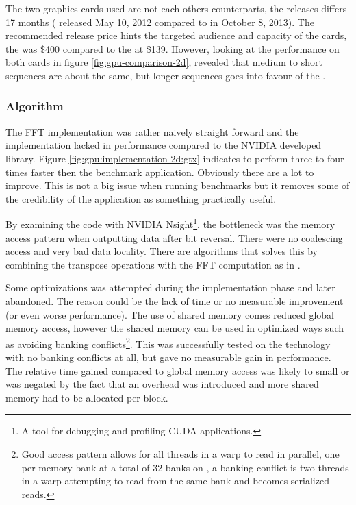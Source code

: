 The two graphics cards used are not each others counterparts, the releases differs 17 months ({\NVCARD} released May 10, 2012 compared to {\AMDCARD} in October 8, 2013). The recommended release price hints the targeted audience and capacity of the cards, the {\NVCARD} was \$400 compared to the {\AMDCARD} at \$139. However, looking at the {\OCL} performance on both cards in figure \ref{fig:gpu-comparison-2d}, revealed that medium to short sequences are about the same, but longer sequences goes into favour of the {\NVCARD}.

\subsubsection{Algorithm}

The \gls{FFT} implementation was rather naively straight forward and the implementation lacked in performance compared to the NVIDIA developed {\CUFFT} library. Figure \ref{fig:gpu:implementation-2d:gtx} indicates {\CUFFT} to perform three to four times faster then the benchmark application. Obviously there are a lot to improve. This is not a big issue when running benchmarks but it removes some of the credibility of the application as something practically useful.

By examining the code with NVIDIA Nsight\footnote{A tool for debugging and profiling CUDA applications.}, the bottleneck was the memory access pattern when outputting data after bit reversal. There were no coalescing access and very bad data locality. There are algorithms that solves this by combining the transpose operations with the FFT computation as in \cite{govindaraju2008high}.

Some optimizations was attempted during the implementation phase and later abandoned. The reason could be the lack of time or no measurable improvement (or even worse performance). The use of shared memory comes reduced global memory access, however the shared memory can be used in optimized ways such as avoiding banking conflicts\footnote{Good access pattern allows for all threads in a warp to read in parallel, one per memory bank at a total of 32 banks on {\NVCARD}, a banking conflict is two threads in a warp attempting to read from the same bank and becomes serialized reads.}. This was successfully tested on the {\CU} technology with no banking conflicts at all, but gave no measurable gain in performance. The relative time gained compared to global memory access was likely to small or was negated by the fact that an overhead was introduced and more shared memory had to be allocated per block.


